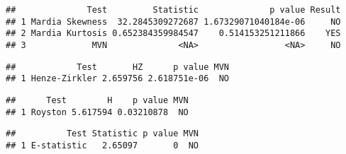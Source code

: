 \documentclass[
]{article}
\newenvironment{Shaded}{\begin{snugshade}}{\end{snugshade}}
\newcommand{\CommentTok}[1]{\textcolor[rgb]{0.56,0.35,0.01}{\textit{#1}}}
\newcommand{\DataTypeTok}[1]{\textcolor[rgb]{0.13,0.29,0.53}{#1}}
\newcommand{\KeywordTok}[1]{\textcolor[rgb]{0.13,0.29,0.53}{\textbf{#1}}}
\newcommand{\NormalTok}[1]{#1}
\newcommand{\OperatorTok}[1]{\textcolor[rgb]{0.81,0.36,0.00}{\textbf{#1}}}
\newcommand{\StringTok}[1]{\textcolor[rgb]{0.31,0.60,0.02}{#1}}
\begin{document}
\begin{verbatim}
##              Test         Statistic              p value Result
## 1 Mardia Skewness  32.2845309272687 1.67329071040184e-06     NO
## 2 Mardia Kurtosis 0.652384359984547    0.514153251211866    YES
## 3             MVN              <NA>                 <NA>     NO
\end{verbatim}

\begin{Shaded}
\end{Shaded}

\begin{verbatim}
##            Test       HZ      p value MVN
## 1 Henze-Zirkler 2.659756 2.618751e-06  NO
\end{verbatim}

\begin{Shaded}
\end{Shaded}

\begin{verbatim}
##      Test        H    p value MVN
## 1 Royston 5.617594 0.03210878  NO
\end{verbatim}

\begin{Shaded}
\end{Shaded}

\begin{verbatim}
##          Test Statistic p value MVN
## 1 E-statistic   2.65097       0  NO
\end{verbatim}
\end{document}
